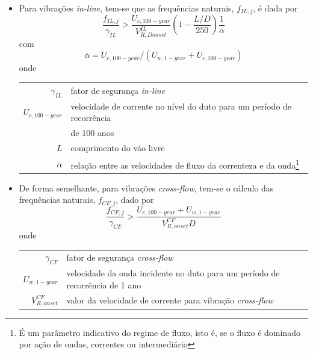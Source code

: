 \begin{itemize}
	\item Para vibrações \textit{in-line}, tem-se que as frequências naturais, $f_{\mathit{IL},j}$, é dada por
	\begin{equation}
	\label{eq:viv-eqil}
	\frac{f_{\mathit{IL},j}}{\gamma_\mathit{IL}} > \frac{U_{c,100-\mathit{year}}}{V_{R, D \mathit{onset}}^\mathit{IL}} \left( 1 - \frac{L/D}{250}\right) \frac{1}{\overline{\alpha}}
	\end{equation}
	com
	\begin{equation}
	\overline{\alpha} = {U_{c,100-\mathit{year}}}/{(U_{w,1-\mathit{year}} + U_{c,100-\mathit{year}})}
	\end{equation}
	onde

	\begin{tabular}{rl}
		$\gamma_\mathit{IL}$      & fator de segurança \textit{in-line}\\
		$U_{c,100-\mathit{year}}$ & velocidade de corrente no nível do duto para um período de recorrência \\
		                          & de 100 anos\\
		$L$                       & comprimento do vão livre\\
		$\overline{\alpha}$       & relação entre as velocidades de fluxo da correnteza e da onda\footnote{É um parâmetro indicativo do regime de fluxo, isto é, se o fluxo é dominado por ação de ondas, correntes ou intermediário}
	\end{tabular}

	\item De forma semelhante, para vibrações \textit{cross-flow}, tem-se o cálculo das frequências naturais, $f_{\mathit{CF},j}$, dado por
	\begin{equation}
	\label{eq:viv-eqcf}
	\frac{f_{\mathit{CF},j}}{\gamma_\mathit{CF}} > \frac{U_{c,100-\mathit{year}} + U_{w,1-\mathit{year}}}{ V_{R,\mathit{onset}}^{\mathit{CF}} D}
	\end{equation}
	onde

	\begin{tabular}{rl}
		$\gamma_\mathit{CF}$               & fator de segurança \textit{cross-flow}\\
		$U_{w,1-\mathit{year}}$            & velocidade da onda incidente no duto para um período de recorrência de 1 ano\\
		$V_{R,\mathit{onset}}^\mathit{CF}$ & valor da  velocidade de corrente para vibração \textit{cross-flow}
	\end{tabular}
\end{itemize}

